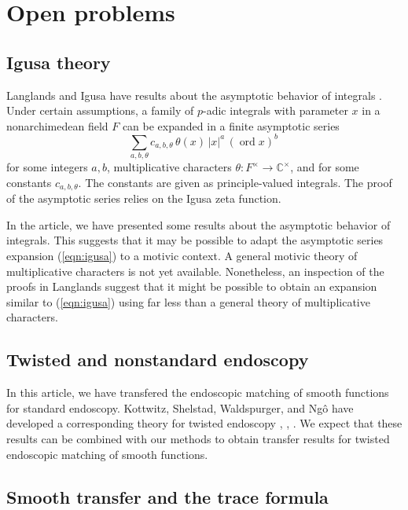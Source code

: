 \documentclass[12pt]{amsart}
\newcommand{\op}[1]{\operatorname{#1}}
\newcommand{\ring}[1]{{\mathbb #1}}
\theoremstyle{plain}
\theoremstyle{definition}
\begin{document}
\section{Open problems}\label{sec:open-problems}

\subsection{Igusa theory}

Langlands and Igusa have results about the asymptotic behavior of
integrals \cite{langlands1983orbital} \cite{igusa1978lectures}.  Under
certain assumptions, a family of $p$-adic integrals with parameter $x$
in a nonarchimedean field $F$ can be expanded in a finite asymptotic
series
\begin{equation}\label{eqn:igusa}
\sum_{a,b,\theta} c_{a,b,\theta} \,
\theta(x) \,|x|^a \, (\op{ord}x)^b\, 
\end{equation}
for some integers $a,b$, multiplicative characters $\theta:F^\times\to
\ring{C}^\times$, and for some constants $c_{a,b,\theta}$.  The
constants are given as principle-valued integrals.  The proof of the
asymptotic series relies on the Igusa zeta function.

In the article, we have presented some results about the asymptotic
behavior of integrals.  This suggests that it may be possible to adapt
the asymptotic series expansion (\ref{eqn:igusa}) to a motivic
context.  A general motivic theory of multiplicative characters is
not yet available.  Nonetheless, an inspection of the proofs in
Langlands suggest that it might be possible to obtain an
expansion similar to (\ref{eqn:igusa}) using far less than a general
theory of multiplicative characters.

\subsection{Twisted and nonstandard endoscopy}

In this article, we have transfered the endoscopic matching of smooth
functions for standard endoscopy.  Kottwitz, Shelstad, Waldspurger,
and Ng\^o have developed a corresponding theory for twisted endoscopy
\cite{kottwitz1999foundations}, \cite{waldspurger2008endoscopie},
\cite{ngo2010lemme}.  We expect that these results can be combined
with our methods to obtain transfer results for twisted endoscopic
matching of smooth functions.

\subsection{Smooth transfer and the trace formula}
\end{document}
